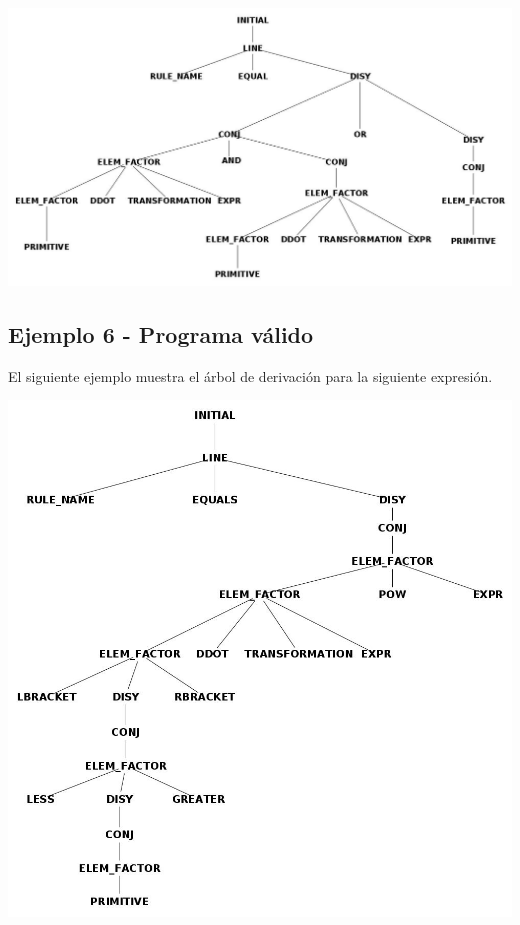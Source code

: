 %

\centerline{\includegraphics[scale=0.40]{arboles_derivacion/Ejemplo_and_or1.jpg}}

\subsection{Ejemplo 6 - Programa v\'alido}

El siguiente ejemplo muestra el \'arbol de derivaci\'on para la siguiente expresi\'on.



\centerline{\includegraphics[scale=0.40]{arboles_derivacion/brackets_less_greater1.jpg}}
